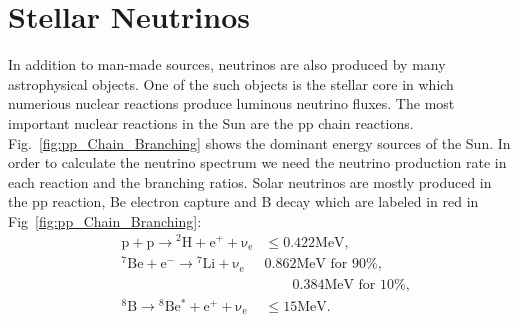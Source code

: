 \section{Stellar Neutrinos}


In addition to man-made sources, neutrinos are also produced by many astrophysical objects.%
One of the such objects is the stellar core in which numerious nuclear reactions produce luminous neutrino fluxes.%
The most important nuclear reactions in the Sun are the pp chain reactions. Fig.~\ref{fig:pp_Chain_Branching} shows the dominant energy sources of the Sun. In order to calculate the neutrino spectrum we need the neutrino production rate in each reaction and the branching ratios. Solar neutrinos are mostly produced in the pp reaction, Be electron capture and B decay which are labeled in red in Fig~\ref{fig:pp_Chain_Branching}:
\begin{align*}
&\mathrm{p+p\to {}^2H + e^+ +\nu_e}  & \mathrm{\leq 0.422MeV},\\
&\mathrm{{}^7Be + e^- \to {}^7Li + \nu_e} &\text{0.862MeV for 90\%},\\
&&\qquad \text{0.384MeV for 10\%}, \\
&\mathrm{{}^8B \to {}^8Be^* +e^+ +\nu_e}  & \mathrm{\leq 15 MeV}.
\end{align*}




